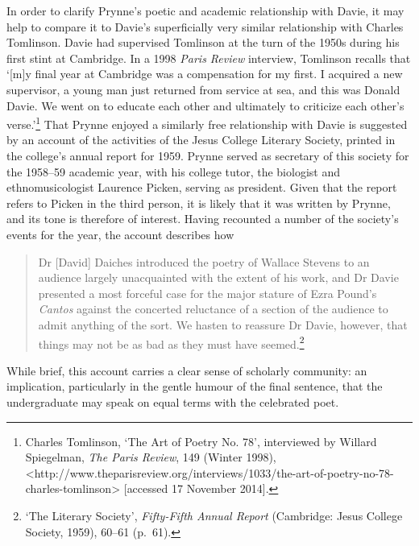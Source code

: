 \documentclass[]{article}
\begin{document}
In order to clarify Prynne's poetic and academic relationship with
Davie, it may help to compare it to Davie's superficially very similar
relationship with Charles Tomlinson. Davie had supervised Tomlinson at
the turn of the 1950s during his first stint at Cambridge. In a 1998
\emph{Paris Review} interview, Tomlinson recalls that `{[}m{]}y final
year at Cambridge was a compensation for my first. I acquired a new
supervisor, a young man just returned from service at sea, and this was
Donald Davie. We went on to educate each other and ultimately to
criticize each other's verse.'\footnote{Charles Tomlinson, `The Art of
  Poetry No. 78', interviewed by Willard Spiegelman, \emph{The Paris
  Review}, 149 (Winter 1998),
  \textless{}http://www.theparisreview.org/interviews/1033/the-art-of-poetry-no-78-charles-tomlinson\textgreater{}
  {[}accessed 17 November 2014{]}.} That Prynne enjoyed a similarly free
relationship with Davie is suggested by an account of the activities of
the Jesus College Literary Society, printed in the college's annual
report for 1959. Prynne served as secretary of this society for the
1958--59 academic year, with his college tutor, the biologist and
ethnomusicologist Laurence Picken, serving as president. Given that the
report refers to Picken in the third person, it is likely that it was
written by Prynne, and its tone is therefore of interest. Having
recounted a number of the society's events for the year, the account
describes how

\begin{quote}
Dr {[}David{]} Daiches introduced the poetry of Wallace Stevens to an
audience largely unacquainted with the extent of his work, and Dr Davie
presented a most forceful case for the major stature of Ezra Pound's
\emph{Cantos} against the concerted reluctance of a section of the
audience to admit anything of the sort. We hasten to reassure Dr Davie,
however, that things may not be as bad as they must have
seemed.\footnote{`The Literary Society', \emph{Fifty-Fifth Annual
  Report} (Cambridge: Jesus College Society, 1959), 60--61 (p.~61).}
\end{quote}

\noindent While brief, this account carries a clear sense of scholarly
community: an implication, particularly in the gentle humour of the
final sentence, that the undergraduate may speak on equal terms with the
celebrated poet.
\end{document}
